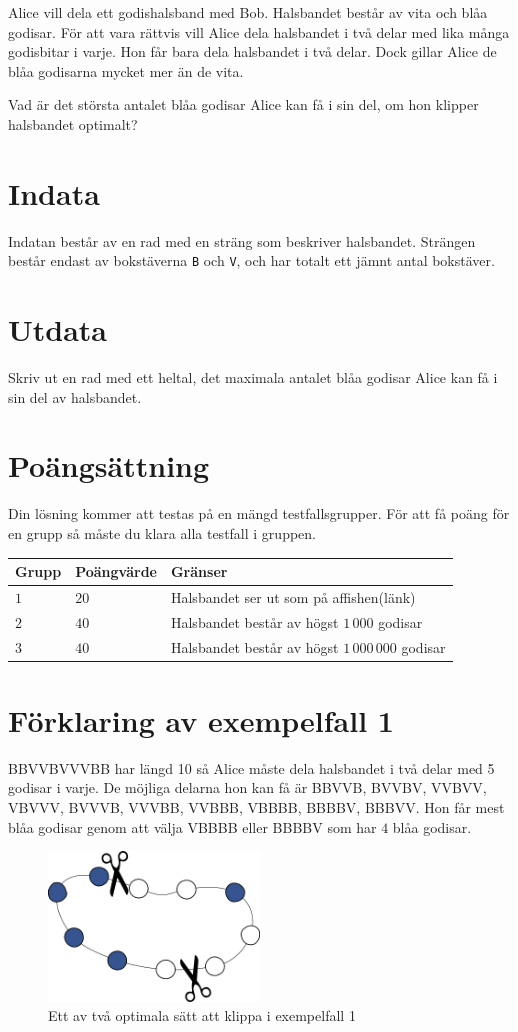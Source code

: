 Alice vill dela ett godishalsband med Bob.
Halsbandet består av vita och blåa godisar.
För att vara rättvis vill Alice dela halsbandet i två
delar med lika många godisbitar i varje.
Hon får bara dela halsbandet i två delar.
Dock gillar Alice de blåa godisarna mycket mer än de vita.

Vad är det största antalet blåa godisar Alice kan få i sin del,
om hon klipper halsbandet optimalt?

\section*{Indata}
Indatan består av en rad med en sträng som beskriver halsbandet.
Strängen består endast av bokstäverna \texttt{B} och \texttt{V},
och har totalt ett jämnt antal bokstäver.

\section*{Utdata}
Skriv ut en rad med ett heltal, det maximala antalet blåa godisar Alice
kan få i sin del av halsbandet.

\section*{Poängsättning}
Din lösning kommer att testas på en mängd testfallsgrupper.
För att få poäng för en grupp så måste du klara alla testfall i gruppen.

\noindent
\begin{tabular}{| l | l | l |}
\hline
Grupp & Poängvärde & Gränser \\ \hline
$1$   & $20$       & Halsbandet ser ut som på affishen(länk) \\ \hline
$2$   & $40$       & Halsbandet består av högst $1\,000$ godisar\\ \hline
$3$   & $40$       & Halsbandet består av högst $1\,000\,000$ godisar \\ \hline
\end{tabular}

\section*{Förklaring av exempelfall 1}
BBVVBVVVBB har längd 10 så Alice måste dela halsbandet i två delar med 5 godisar i varje.
De möjliga delarna hon kan få är BBVVB, BVVBV, VVBVV, VBVVV, BVVVB, VVVBB, VVBBB, VBBBB, BBBBV, BBBVV.
Hon får mest blåa godisar genom att välja VBBBB eller BBBBV som har $4$ blåa godisar.

\begin{figure}[h]
	\centering
\includegraphics[width=0.5\textwidth]{sample1}
\caption{Ett av två optimala sätt att klippa i exempelfall 1}
\end{figure}
